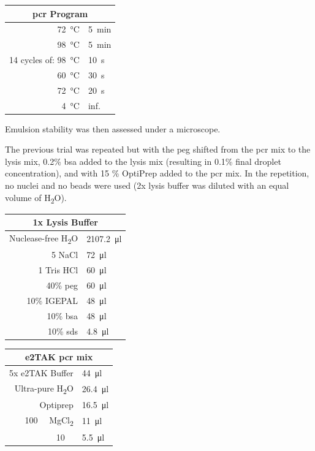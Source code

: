 \begin{appendix}
\begin{multicols}{2}
\begin{center}
\begin{tabular}{r|l}
	\multicolumn{2}{c}{\acrshort{pcr} Program} \\
	\hline
	\SI{72}{\celsius} & \SI{5}{\minute} \\
	\SI{98}{\celsius} & \SI{5}{\minute} \\
	\hline
	14 cycles of: \SI{98}{\celsius} & \SI{10}{\second} \\
	\SI{60}{\celsius} & \SI{30}{\second} \\
	\SI{72}{\celsius} & \SI{20}{\second} \\
	\hline
	\SI{4}{\celsius} & inf. \\
\end{tabular}
\end{center}
\medskip

Emulsion stability was then assessed under a microscope.\pms

The previous trial was repeated but with the \acrshort{peg} shifted from the \acrshort{pcr} mix to the lysis mix, 0.2\% \acrshort{bsa} added to the lysis mix (resulting in 0.1\% final droplet concentration), and with 15 \% OptiPrep added to the \acrshort{pcr} mix. In the repetition, no nuclei and no beads were used (2x lysis buffer was diluted with an equal volume of H\textsubscript{2}O).\pms

\begin{center}
\begin{tabular}{r|l}
	\multicolumn{2}{c}{1x Lysis Buffer} \\
	\hline
	Nuclease-free H\textsubscript{2}O & \SI{2107.2}{\ul} \\
	\SI{5}{\molar} NaCl & \SI{72}{\ul} \\
	\SI{1}{\molar} Tris HCl  & \SI{60}{\ul} \\
	40\% \acrshort{peg} & \SI{60}{\ul} \\
	10\% IGEPAL & \SI{48}{\ul} \\
	10\% \acrshort{bsa} & \SI{48}{\ul} \\
	10\% \acrshort{sds} & \SI{4.8}{\ul} \\
\end{tabular}
\end{center}
\medskip

\begin{center}
\begin{tabular}{r|l}
	\multicolumn{2}{c}{e2TAK \acrshort{pcr} mix} \\
	\hline
	5x e2TAK Buffer & \SI{44}{\ul} \\
	Ultra-pure H\textsubscript{2}O & \SI{26.4}{\ul}  \\
	Optiprep & \SI{16.5}{\ul} \\
	\SI{100}{\milli\molar} MgCl\textsubscript{2} & \SI{11}{\ul} \\
	\SI{10}{\milli\molar} \acrshortpl{dntp}  & \SI{5.5}{\ul} \\
\end{tabular}
\end{center}
\medskip


\end{multicols}
\end{appendix}
